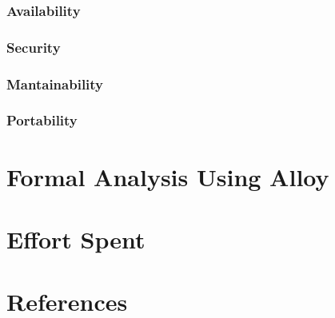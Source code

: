 \documentclass{article}
\begin{document}
	
	
	\subsubsection{Availability}
	
	
	
	\subsubsection{Security}
	
	
	
	\subsubsection{Mantainability}
	
	
	
	\subsubsection{Portability}
	
	
	
	\section{Formal Analysis Using Alloy}
	
	
	
	\section{Effort Spent}
	
	
	
	\section{References}
	
	
\end{document}

